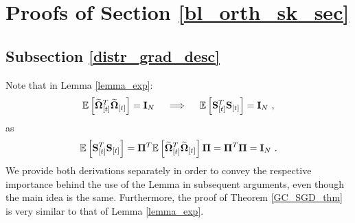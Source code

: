 \documentclass[journal,letterpaper,onecolumn,twoside,nofonttune]{IEEEtran}
\newcommand{\Pibold}{\bold{\Pi}}
\newcommand{\Omb}{\bold{\Omega}}
\newcommand{\Ombwt}{\widetilde{\Omb}}
\newcommand{\E}{\mathbb{E}}
\newcommand{\Sb}{\bold{S}}
\newcommand{\Ib}{\bold{I}}
\begin{document}




\appendices
\section{Proofs of Section \ref{bl_orth_sk_sec}}

\subsection{Subsection \ref{distr_grad_desc}}

Note that in Lemma \ref{lemma_exp}:
$$ \E\left[\Ombwt_{[t]}^T\Ombwt_{[t]}\right]=\Ib_N \quad \implies \quad \E\left[\Sb_{[t]}^T\Sb_{[t]}\right]=\Ib_N\ , $$
as
$$ \E\left[\Sb_{[t]}^T\Sb_{[t]}\right]=\Pibold^T\E\left[\Ombwt_{[t]}^T\Ombwt_{[t]}\right]\Pibold=\Pibold^T\Pibold=\Ib_N\ . $$
We provide both derivations separately in order to convey the respective importance behind the use of the Lemma in subsequent arguments, even though the main idea is the same. Furthermore, the proof of Theorem \ref{GC_SGD_thm} is very similar to that of Lemma \ref{lemma_exp}.
\end{document}
